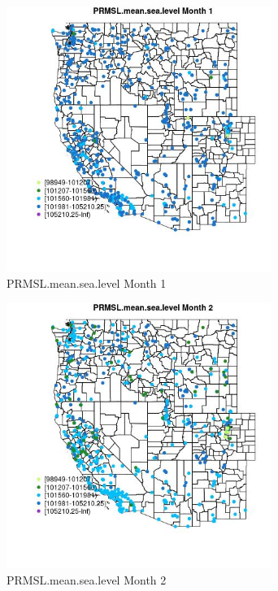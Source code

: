 \begin{figure} 
\centering  
\includegraphics[width=0.77\textwidth]{Code_Outputs/Report_ML_input_PM25_Step4_part_e_de_duplicated_aves_compiled_2019-05-14wNAs_MapObsMo1PRMSLmeansealevel.jpg} 
\caption{\label{fig:Report_ML_input_PM25_Step4_part_e_de_duplicated_aves_compiled_2019-05-14wNAsMapObsMo1PRMSLmeansealevel}PRMSL.mean.sea.level Month 1} 
\end{figure} 
 

\begin{figure} 
\centering  
\includegraphics[width=0.77\textwidth]{Code_Outputs/Report_ML_input_PM25_Step4_part_e_de_duplicated_aves_compiled_2019-05-14wNAs_MapObsMo2PRMSLmeansealevel.jpg} 
\caption{\label{fig:Report_ML_input_PM25_Step4_part_e_de_duplicated_aves_compiled_2019-05-14wNAsMapObsMo2PRMSLmeansealevel}PRMSL.mean.sea.level Month 2} 
\end{figure} 
 

